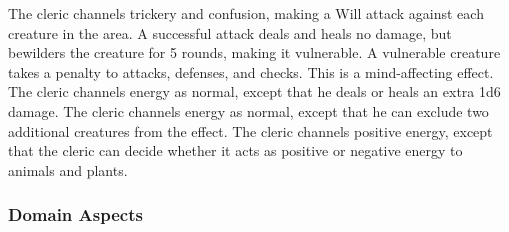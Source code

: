  The cleric channels trickery and confusion, making a Will attack against each creature in the area. A successful attack deals and heals no damage, but bewilders the creature for 5 rounds, making it vulnerable. A vulnerable creature takes a  penalty to attacks, defenses, and checks. This is a mind-affecting effect.
 The cleric channels energy as normal, except that he deals or heals an extra 1d6 damage.
 The cleric channels energy as normal, except that he can exclude two additional creatures from the effect.
 The cleric channels positive energy, except that the cleric can decide whether it acts as positive or negative energy to animals and plants.

\subsubsection{Domain Aspects}\label{Domain Aspects}

